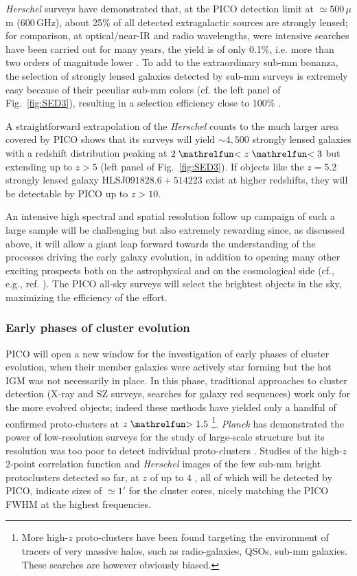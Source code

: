 \documentclass[PICOReport.tex]{subfiles}
\begin{document}
\textit{Herschel} surveys have demonstrated that, at the PICO detection limit at $\simeq 500\,\mu$m (600\,GHz), about 25\% of all detected extragalactic sources are strongly lensed; for comparison, at optical/near-IR and radio wavelengths, were intensive searches have been carried out for many years, the yield is of only 0.1\%, i.e. more than two orders of magnitude lower \cite{Treu2010}. To add to the extraordinary sub-mm bonanza, the selection of strongly lensed galaxies detected by sub-mm surveys is extremely easy because of their peculiar sub-mm colors (cf. the left panel of Fig.~\ref{fig:SED3}), resulting in a selection efficiency close to 100\% \cite{Negrello2010}.

A straightforward extrapolation of the \textit{Herschel} counts to the much larger area covered by PICO shows that its surveys will yield $\sim 4,500$ strongly lensed galaxies with a redshift distribution peaking at $2\simlt z \simlt 3$ \cite{Negrello2017lensed} but extending up to $z> 5$ (left panel of Fig.~\ref{fig:SED3}). If objects like the $z=5.2$ strongly lensed galaxy HLSJ$091828.6+514223$ exist at higher redshifts, they will be detectable by PICO up to $z>10$.

An intensive high spectral and spatial resolution follow up campaign of such a large sample will be challenging but also extremely rewarding since, as discussed above, it will allow a giant leap forward towards the understanding of the processes driving the early galaxy evolution, in addition to opening many other exciting prospects both on the astrophysical and on the cosmological side (cf., e.g., ref. \cite{Treu2010}). The PICO all-sky surveys will select the brightest objects in the sky, maximizing the efficiency of the effort.

\subsubsection{Early phases of cluster evolution}

PICO will open a new window for the investigation of early phases of cluster evolution, when their member galaxies were actively star forming but the hot IGM was not necessarily in place. In this phase, traditional approaches to cluster detection (X-ray and SZ surveys, searches for galaxy red sequences) work only for the more evolved objects; indeed these methods have yielded only a handful of confirmed proto-clusters at $z\simgt 1.5$ \cite{Overzier2016}\footnote{More high-$z$ proto-clusters have been found targeting the environment of tracers of very massive halos, such as radio-galaxies, QSOs, sub-mm galaxies. These searches are however obviously biased.}.
\textit{Planck} has demonstrated the power of low-resolution surveys for the study of large-scale structure  \cite{Planck2016high_z} but its resolution was too poor to detect individual proto-clusters \cite{Negrello2017protocl}.  Studies of the high-$z$ 2-point correlation function \cite{Chen2016, Negrello2017protocl} and \textit{Herschel} images of the few sub-mm bright protoclusters detected so far, at $z$ of up to 4 \cite{Ivison2013, Wang2016, Oteo2018}, all of which will be detected by PICO, indicate sizes of $\simeq 1'$ for the cluster cores, nicely matching the PICO FWHM at the highest frequencies.
\end{document}
